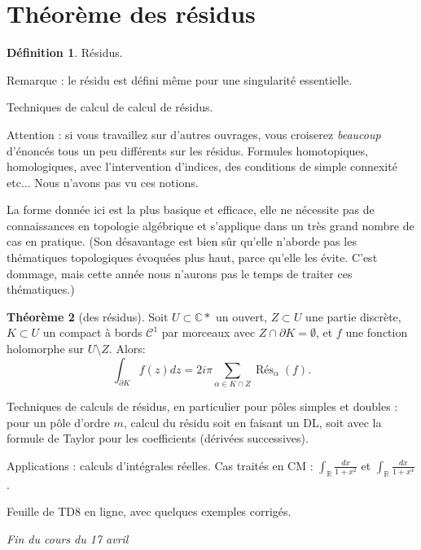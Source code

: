 \documentclass[11pt,a4paper]{book}
\newcommand{\R}{\mathbb{R}}
\newcommand{\C}{\mathbb{C}}
\theoremstyle{definition}
\newtheorem{theoreme}{Th\'eor\`eme}[section]
\newtheorem{definition}[theoreme]{D\'efinition}
\theoremstyle{plain}
\begin{document}


\section{Théorème des résidus}

\begin{definition}
Résidus.
\end{definition}

Remarque : le résidu est défini même pour une singularité essentielle.

Techniques de calcul de calcul de résidus.

Attention : si vous travaillez sur d'autres ouvrages, vous croiserez \emph{beaucoup} d'énoncés tous un peu différents sur les résidus. Formules homotopiques, homologiques, avec l'intervention d'indices, des conditions de simple connexité  etc... Nous n'avons pas vu ces notions. 

La forme donnée ici est la plus basique et efficace, elle ne nécessite pas de connaissances en topologie algébrique et s'applique dans un très grand nombre de cas en pratique. 
(Son désavantage est bien sûr qu'elle n'aborde pas les thématiques topologiques évoquées plus haut, parce qu'elle les évite. C'est dommage, mais cette année nous n'aurons pas le temps de traiter ces thématiques.)

\begin{theoreme}[des résidus]
Soit $U\subset \C*$ un ouvert, $Z\subset U$ une partie discrète, $K\subset U$ un compact à bords $\mathcal C^1$ par morceaux avec $Z\cap \partial K = \emptyset$, et $f$ une fonction holomorphe sur $U\setminus Z$.
Alors:
\[ \int_{\partial K} f(z)dz = 2i\pi \sum_{\alpha \in K\cap Z} \operatorname{Rés}_\alpha(f).\]
\end{theoreme}

Techniques de calculs de résidus, en particulier pour pôles simples et doubles : pour un pôle d'ordre $m$, calcul du résidu soit en faisant un DL, soit avec la formule de Taylor pour les coefficients (dérivées successives).


Applications : calculs d'intégrales réelles. Cas traités en CM : $\int_\R \frac{dx}{1+x^2}$ et $\int_\R \frac{dx}{1+x^4}$.

Feuille de TD8 en ligne, avec quelques exemples corrigés.

\begin{center}
\hrulefill \emph{Fin du cours du 17 avril} \hrulefill
\end{center}
\end{document}
